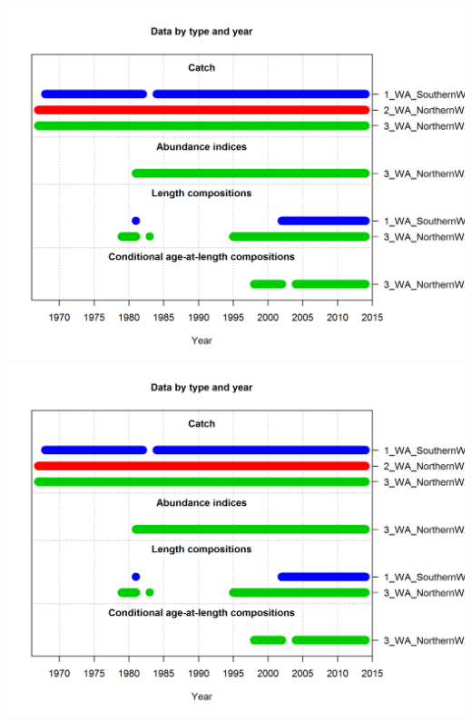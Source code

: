 \documentclass[12pt,]{article}
\begin{document}
\includegraphics{r4ss/plots_mod1/data_plot.png}
\includegraphics{r4ss/plots_mod2/data_plot.png}

\FloatBarrier

\FloatBarrier

\FloatBarrier

\FloatBarrier

\FloatBarrier

\FloatBarrier
\end{document}
